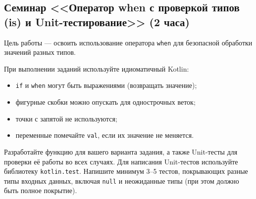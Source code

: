 \subsection{Семинар <<Оператор when с проверкой типов (is) и Unit-тестирование>> (2 часа)}

Цель работы — освоить использование оператора \texttt{when} для безопасной обработки значений разных типов.

При выполнении заданий используйте идиоматичный Kotlin:
\begin{itemize}
\item \texttt{if} и \texttt{when} могут быть выражениями (возвращать значение);
    \item фигурные скобки можно опускать для однострочных веток;
    \item точки с запятой не используются;
    \item переменные помечайте \texttt{val}, если их значение не меняется.
\end{itemize}

Разработайте функцию для вашего варианта задания, а также Unit-тесты для проверки её работы во всех случаях. Для написания Unit-тестов используйте библиотеку \texttt{kotlin.test}. Напишите минимум 3–5 тестов, покрывающих разные типы входных данных, включая \texttt{null} и неожиданные типы (при этом должно быть полное покрытие).

